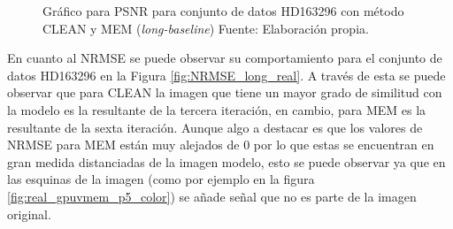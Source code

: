 \begin{figure}[!ht]
 \centering
 \caption[Gráfico para PSNR para conjunto de datos HD163296 con método CLEAN y MEM (\textit{long-baseline})]{Gráfico para PSNR para conjunto de datos HD163296 con método CLEAN y MEM (\textit{long-baseline}) Fuente: Elaboración propia.}
 \label{fig:PSNR_long_real}
\end{figure}

En cuanto al NRMSE se puede observar su comportamiento para el conjunto de datos HD163296 en la Figura \ref{fig:NRMSE_long_real}. A través de esta se puede observar que para CLEAN la imagen que tiene un mayor grado de similitud con la modelo es la resultante de la tercera iteración, en cambio, para MEM es la resultante de la sexta iteración. Aunque algo a destacar es que los valores de NRMSE para MEM están muy alejados de 0 por lo que estas se encuentran en gran medida distanciadas de la imagen modelo, esto se puede observar ya que en las esquinas de la imagen (como por ejemplo en la figura \ref{fig:real_gpuvmem_p5_color}) se añade señal que no es parte de la imagen original.

